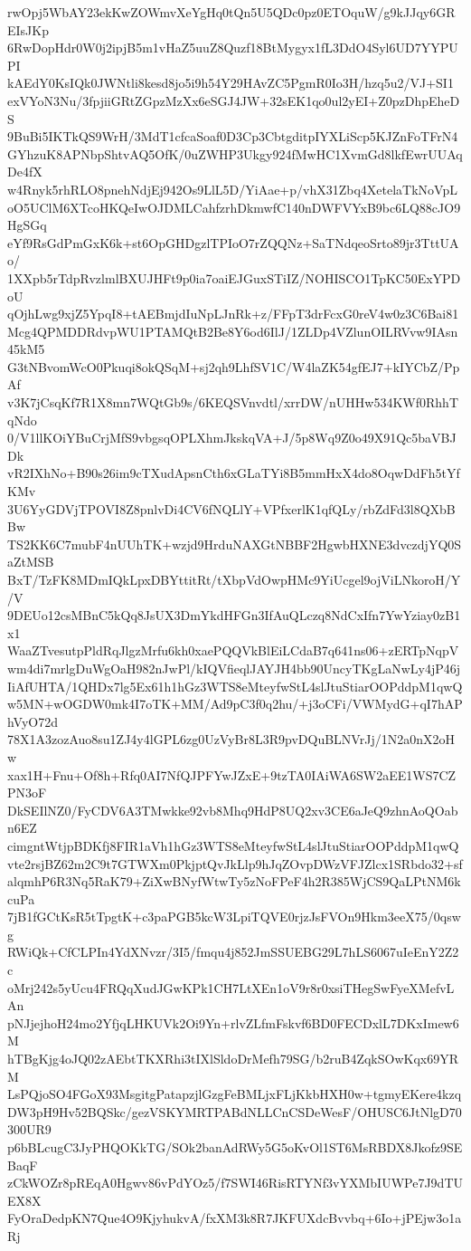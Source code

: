 rwOpj5WbAY23ekKwZOWmvXeYgHq0tQn5U5QDc0pz0ETOquW/g9kJJqy6GREIsJKp
6RwDopHdr0W0j2ipjB5m1vHaZ5uuZ8Quzf18BtMygyx1fL3DdO4Syl6UD7YYPUPI
kAEdY0KsIQk0JWNtli8kesd8jo5i9h54Y29HAvZC5PgmR0Io3H/hzq5u2/VJ+SI1
exVYoN3Nu/3fpjiiGRtZGpzMzXx6eSGJ4JW+32sEK1qo0ul2yEI+Z0pzDhpEheDS
9BuBi5IKTkQS9WrH/3MdT1cfcaSoaf0D3Cp3CbtgditpIYXLiScp5KJZnFoTFrN4
GYhzuK8APNbpShtvAQ5OfK/0uZWHP3Ukgy924fMwHC1XvmGd8lkfEwrUUAqDe4fX
w4Rnyk5rhRLO8pnehNdjEj942Os9LlL5D/YiAae+p/vhX31Zbq4XetelaTkNoVpL
oO5UClM6XTcoHKQeIwOJDMLCahfzrhDkmwfC140nDWFVYxB9bc6LQ88cJO9HgSGq
eYf9RsGdPmGxK6k+st6OpGHDgzlTPIoO7rZQQNz+SaTNdqeoSrto89jr3TttUAo/
1XXpb5rTdpRvzlmlBXUJHFt9p0ia7oaiEJGuxSTiIZ/NOHISCO1TpKC50ExYPDoU
qOjhLwg9xjZ5YpqI8+tAEBmjdIuNpLJnRk+z/FFpT3drFcxG0reV4w0z3C6Bai81
Mcg4QPMDDRdvpWU1PTAMQtB2Be8Y6od6IlJ/1ZLDp4VZlunOILRVvw9IAsn45kM5
G3tNBvomWcO0Pkuqi8okQSqM+sj2qh9LhfSV1C/W4laZK54gfEJ7+kIYCbZ/PpAf
v3K7jCsqKf7R1X8mn7WQtGb9s/6KEQSVnvdtl/xrrDW/nUHHw534KWf0RhhTqNdo
0/V1llKOiYBuCrjMfS9vbgsqOPLXhmJkskqVA+J/5p8Wq9Z0o49X91Qc5baVBJDk
vR2IXhNo+B90s26im9cTXudApsnCth6xGLaTYi8B5mmHxX4do8OqwDdFh5tYfKMv
3U6YyGDVjTPOVI8Z8pnlvDi4CV6fNQLlY+VPfxerlK1qfQLy/rbZdFd3l8QXbBBw
TS2KK6C7mubF4nUUhTK+wzjd9HrduNAXGtNBBF2HgwbHXNE3dvczdjYQ0SaZtMSB
BxT/TzFK8MDmIQkLpxDBYttitRt/tXbpVdOwpHMc9YiUcgel9ojViLNkoroH/Y/V
9DEUo12csMBnC5kQq8JsUX3DmYkdHFGn3IfAuQLczq8NdCxIfn7YwYziay0zB1x1
WaaZTvesutpPldRqJlgzMrfu6kh0xaePQQVkBlEiLCdaB7q641ns06+zERTpNqpV
wm4di7mrlgDuWgOaH982nJwPl/kIQVfieqlJAYJH4bb90UncyTKgLaNwLy4jP46j
IiAfUHTA/1QHDx7lg5Ex61h1hGz3WTS8eMteyfwStL4slJtuStiarOOPddpM1qwQ
w5MN+wOGDW0mk4I7oTK+MM/Ad9pC3f0q2hu/+j3oCFi/VWMydG+qI7hAPhVyO72d
78X1A3zozAuo8su1ZJ4y4lGPL6zg0UzVyBr8L3R9pvDQuBLNVrJj/1N2a0nX2oHw
xax1H+Fnu+Of8h+Rfq0AI7NfQJPFYwJZxE+9tzTA0IAiWA6SW2aEE1WS7CZPN3oF
DkSEIlNZ0/FyCDV6A3TMwkke92vb8Mhq9HdP8UQ2xv3CE6aJeQ9zhnAoQOabn6EZ
cimgntWtjpBDKfj8FIR1aVh1hGz3WTS8eMteyfwStL4slJtuStiarOOPddpM1qwQ
vte2rsjBZ62m2C9t7GTWXm0PkjptQvJkLlp9hJqZOvpDWzVFJZlcx1SRbdo32+sf
alqmhP6R3Nq5RaK79+ZiXwBNyfWtwTy5zNoFPeF4h2R385WjCS9QaLPtNM6kcuPa
7jB1fGCtKsR5tTpgtK+c3paPGB5kcW3LpiTQVE0rjzJsFVOn9Hkm3eeX75/0qswg
RWiQk+CfCLPIn4YdXNvzr/3I5/fmqu4j852JmSSUEBG29L7hLS6067uIeEnY2Z2c
oMrj242s5yUcu4FRQqXudJGwKPk1CH7LtXEn1oV9r8r0xsiTHegSwFyeXMefvLAn
pNJjejhoH24mo2YfjqLHKUVk2Oi9Yn+rlvZLfmFskvf6BD0FECDxlL7DKxImew6M
hTBgKjg4oJQ02zAEbtTKXRhi3tIXlSldoDrMefh79SG/b2ruB4ZqkSOwKqx69YRM
LsPQjoSO4FGoX93MsgitgPatapzjlGzgFeBMLjxFLjKkbHXH0w+tgmyEKere4kzq
DW3pH9Hv52BQSkc/gezVSKYMRTPABdNLLCnCSDeWesF/OHUSC6JtNlgD70300UR9
p6bBLcugC3JyPHQOKkTG/SOk2banAdRWy5G5oKvOl1ST6MsRBDX8Jkofz9SEBaqF
zCkWOZr8pREqA0Hgwv86vPdYOz5/f7SWI46RisRTYNf3vYXMbIUWPe7J9dTUEX8X
FyOraDedpKN7Que4O9KjyhukvA/fxXM3k8R7JKFUXdcBvvbq+6Io+jPEjw3o1aRj
